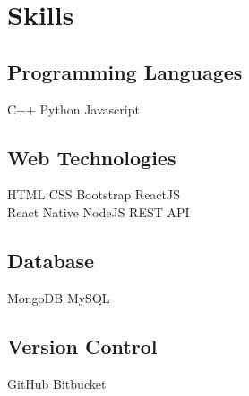 \documentclass[]{deedy-resume-openfont}
\begin{document}
\begin{minipage}[t]{0.33\textwidth}




\section{Skills}
\subsection{Programming Languages}
\textbullet{} C++ \textbullet{}   Python \textbullet{} Javascript \\
\subsection{Web Technologies}
\textbullet{} HTML \textbullet{} CSS \textbullet{} Bootstrap \textbullet{} ReactJS \\ \textbullet{} React Native \textbullet{} NodeJS \textbullet{} REST API \\
\subsection{Database}
\textbullet{} MongoDB \textbullet{} MySQL \\ 
\subsection{Version Control}
\textbullet{} GitHub \textbullet{} Bitbucket
\sectionsep

%
%

\end{minipage} 
\end{document}

